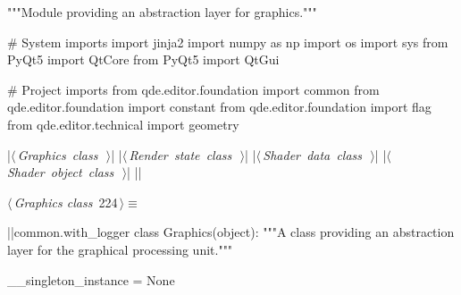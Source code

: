 \documentclass[%
    a4paper,    %
    justified,  %
    nobib,      %
    openany     %
]{tufte-book}
\makeatletter
\renewcommand{\label}[1]{\@tufte@label{##1}}%
\makeatother
\begin{document}
\begin{fullwidth}
\begin{flushleft}
\begin{minipage}{\linewidth}
\begin{pythoncode}
"""Module providing an abstraction layer for graphics."""

# System imports
import jinja2
import numpy as np
import os
import sys
from PyQt5 import QtCore
from PyQt5 import QtGui

# Project imports
from qde.editor.foundation import common
from qde.editor.foundation import constant
from qde.editor.foundation import flag
from qde.editor.technical import geometry


|\hbox{$\langle\,${\itshape Graphics class}\nobreak\ {\footnotesize {}}$\,\rangle$}|
|\hbox{$\langle\,${\itshape Render state class}\nobreak\ {\footnotesize {}}$\,\rangle$}|
|\hbox{$\langle\,${\itshape Shader data class}\nobreak\ {\footnotesize {}}$\,\rangle$}|
|\hbox{$\langle\,${\itshape Shader object class}\nobreak\ {\footnotesize {}}$\,\rangle$}|
|\NWsep|
\end{pythoncode}
\vspace{1.5ex}
\footnotesize
\begin{list}{}{\setlength{\itemsep}{-\parsep}\setlength{\itemindent}{-\leftmargin}}

\item{}
\end{list}
\end{minipage}\vspace{4ex}
\end{flushleft}
\begin{flushleft} \small
\begin{minipage}{\linewidth}\label{scrap230}\raggedright\small
{} $\langle\,${\itshape Graphics class}\nobreak\ {\footnotesize {224}}$\,\rangle\equiv$
\vspace{-1ex}
\begin{pythoncode}
|\normalfont{}\fontfamily{}|common.with_logger
class Graphics(object):
    """A class providing an abstraction layer for the graphical processing
    unit."""

    __singleton_instance = None


\end{pythoncode}
\end{minipage}
\end{flushleft}
\end{fullwidth}
\end{document}
